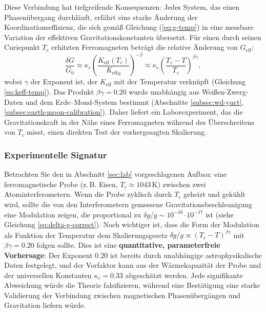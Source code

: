 \documentclass[12pt]{article}
\theoremstyle{remark}
\newcommand{\Keff}{K_{\mathrm{eff}}}
\begin{document}
	Diese Verbindung hat tiefgreifende Konsequenzen: Jedes System, das einen Phasenübergang durchläuft, erfährt eine starke Änderung der Koordinationseffizienz, die sich gemäß Gleichung (\ref{eq:g-temp}) in eine messbare Variation der effektiven Gravitationskonstanten übersetzt. Für einen durch seinen Curiepunkt \(T_c\) erhitzten Ferromagneten beträgt die relative Änderung von \(G_{\mathrm{eff}}\):
	\[
	\frac{\delta G}{G_0} \approx \kappa_c \left( \frac{\Keff(T_c)}{{\Keff}_{0}} \right)^{-\beta} \approx \kappa_c \left( \frac{T_c - T}{T_c} \right)^{\beta\gamma},
	\]
	wobei \(\gamma\) der Exponent ist, der \(\Keff\) mit der Temperatur verknüpft (Gleichung \ref{eq:keff-temp}). Das Produkt \(\beta\gamma = 0.20\) wurde unabhängig aus Weißen-Zwerg-Daten und dem Erde–Mond-System bestimmt (Abschnitte \ref{subsec:wd-yuct}, \ref{subsec:earth-moon-calibration}). Daher liefert ein Laborexperiment, das die Gravitationskraft in der Nähe eines Ferromagneten während des Überschreitens von \(T_c\) misst, einen direkten Test der vorhergesagten Skalierung.
	
	\subsubsection{Experimentelle Signatur}
	Betrachten Sie den in Abschnitt \ref{sec:lab} vorgeschlagenen Aufbau: eine ferromagnetische Probe (z. B. Eisen, \(T_c \approx 1043\,\mathrm{K}\)) zwischen zwei Atominterferometern. Wenn die Probe zyklisch durch \(T_c\) geheizt und gekühlt wird, sollte die von den Interferometern gemessene Gravitationsbeschleunigung eine Modulation zeigen, die proportional zu \(\delta g/g \sim 10^{-16}\)–\(10^{-17}\) ist (siehe Gleichung \ref{eq:delta-g-correct}). Noch wichtiger ist, dass die Form der Modulation als Funktion der Temperatur dem Skalierungsgesetz \(\delta g/g \propto (T_c - T)^{\beta\gamma}\) mit \(\beta\gamma = 0.20\) folgen sollte. Dies ist eine \textbf{quantitative, parameterfreie Vorhersage}: Der Exponent \(0.20\) ist bereits durch unabhängige astrophysikalische Daten festgelegt, und der Vorfaktor kann aus der Wärmekapazität der Probe und der universellen Konstanten \(\kappa_c = 0.33\) abgeschätzt werden. Jede signifikante Abweichung würde die Theorie falsifizieren, während eine Bestätigung eine starke Validierung der Verbindung zwischen magnetischen Phasenübergängen und Gravitation liefern würde.
	
\end{document}
